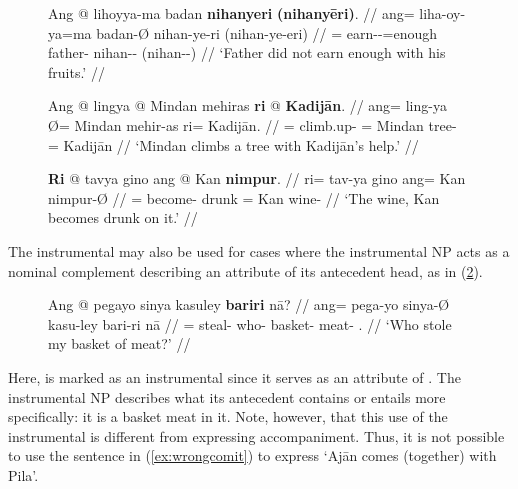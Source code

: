 \begin{figure}
\pex\label{ex:insmarking}
%
\a\begingl
	\gla Ang @ lihoyya-ma badan \textbf{nihanyeri} 
		\textbf{\textup{(}nihanyēri\textup{)}}. //
	\glb ang= liha-oy-ya=ma badan-Ø nihan-ye-ri (nihan-ye-eri) //
	\glc \AgtT{}= earn-\Neg{}-\TsgM{}=enough father-\Top{} 
		nihan-\Pl{}-\Ins{} (nihan-\Pl{}-\Ins) //
	\glft `Father did not earn enough with his fruits.' //
\endgl

\a\begingl
	\gla Ang @ lingya {} @ Mindan mehiras \textbf{ri} @ \textbf{Kadijān}. //
	\glb ang= ling-ya Ø= Mindan mehir-as ri= Kadijān. //
	\glc \AgtT{}= climb.up-\TsgM{} \Top{}= Mindan tree-\Parg{} 
		\Ins{}= Kadijān //
	\glft `Mindan climbs a tree with Kadijān's help.' //
\endgl

\a\begingl
	\gla \textbf{Ri} @ tavya gino ang @ Kan \textbf{nimpur}. //
	\glb ri= tav-ya gino ang= Kan nimpur-Ø //
	\glc \InsT{}= become-\TsgM{} drunk \Aarg{}= Kan wine-\Top{} //
	\glft `The wine, Kan becomes drunk on it.' //
\endgl
\xe
\end{figure}

The instrumental may also be used for cases where the instrumental NP acts as a
nominal complement describing an attribute of its antecedent head, as in
(\ref{ex:nounadjc}).

\begin{figure}[h]
\ex\label{ex:nounadjc}
\begingl
	\gla Ang @ pegayo sinya kasuley \textbf{bariri} nā? //
	\glb ang= pega-yo sinya-Ø kasu-ley bari-ri nā //
	\glc \AgtT{}= steal-\TsgN{} who-\Top{} basket-\PargI{} 
		meat-\Ins{} \Fsg{}.\Gen{} //
	\glft `Who stole my basket of meat?' //
\endgl\xe
\end{figure}

Here,  is marked as an instrumental since it serves as an
attribute of . The instrumental NP describes what its
antecedent contains or entails more specifically: it is a basket  meat
in it. Note, however, that this use of the instrumental is different from
expressing accompaniment. Thus, it is not possible to use the sentence in
(\ref{ex:wrongcomit}) to express `Ajān comes (together) with Pila'.

